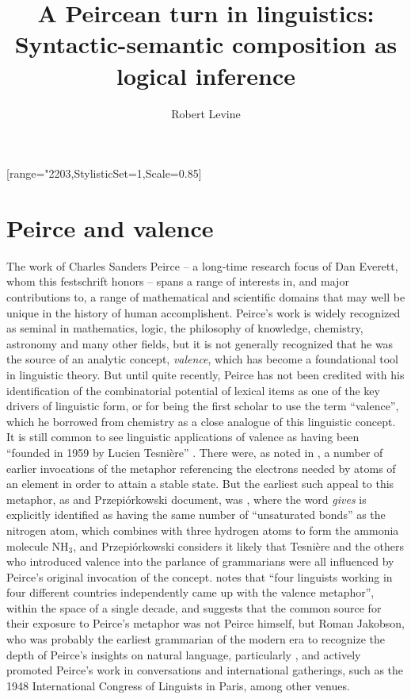 \documentclass[output=paper,colorlinks,citecolor=brown]{langscibook}
\title{A Peircean turn in linguistics: Syntactic-semantic composition as logical inference}
\author{Robert Levine\affiliation{Ohio State University}}
\begin{document}
[range={"2203},StylisticSet=1,Scale=0.85]
\maketitle
\providecommand{\SetInfLen}{\relax}


\section{Peirce and valence}

The work of Charles Sanders Peirce -- a long-time research focus of Dan
Everett, whom this festschrift honors -- spans a range of interests in,
and major contributions to, a range of mathematical and scientific
domains that may well be unique in the history of human
accomplishent. Peirce's work is widely recognized as seminal in
mathematics, logic, the philosophy of knowledge, chemistry, astronomy
and many other fields, but it is not generally recognized that he was
the source of an analytic concept, \emph{valence}, which has become
a foundational tool in linguistic theory. But until quite recently,
Peirce has not been credited with his identification of the
combinatorial potential of lexical items as one of the key drivers of
linguistic form, or for being the first scholar to use the term
``valence'', which he borrowed from chemistry as a close analogue of
this linguistic concept. It is still common to see linguistic
applications of valence as having been ``founded in 1959 by Lucien
Tesnière'' \citep{hollein2022}. There were, as noted in \citet{AdamP-Peirce}, a
number of earlier invocations of the metaphor referencing the
electrons needed by atoms of an element in order to attain a stable
state. But the earliest such appeal to this metaphor, as \citet{askedal91}
and Przepi\'{o}rkowski document, was \citet{peirce1897}, where the word
\textit{gives} is explicitly identified as having the same number of
``unsaturated bonds'' as the nitrogen atom, which combines with three
hydrogen atoms to form the ammonia molecule NH$_3$, and
Przepi{\'o}rkowski considers it likely that Tesnière and the
others who introduced valence into the parlance of grammarians were
all influenced by Peirce's original invocation of the
concept. \citet[155]{AdamP-Peirce} notes that ``four linguists working
in four different countries independently came up with the valence
metaphor'', within the space of a single decade, and suggests that the
common source for their exposure to Peirce's metaphor was not Peirce
himself, but Roman Jakobson, who was probably the earliest
grammarian of the modern era to recognize the depth of Peirce's
insights on natural language, particularly \citet{peirce1897}, and actively
promoted Peirce's work in conversations and international gatherings,
such as the 1948 International Congress of Linguists in Paris, among
other venues.
\end{document}
